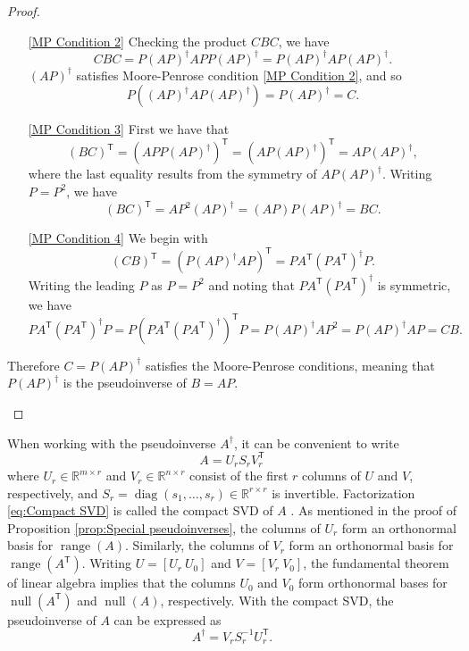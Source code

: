 \documentclass[12pt]{article}
\newcommand{\trans}[1]{{#1}^\mathsf{T}}	%
\newcommand{\inv}[1]{{#1}^{-1}}	%
\newcommand{\pinv}[1]{{#1}^\dagger}	%
\DeclareMathOperator{\diag}{diag}	%
\DeclareMathOperator{\range}{range}	%
\DeclareMathOperator{\nullspace}{null}	%
\newcommand{\singular}{s}	%
\begin{document}
\begin{proof}
\begin{enumerate}
\begin{enumerate}
        \item[\ref{MP Condition 2}] Checking the product $CBC$, we have 
        \[CBC = P\pinv{\left(AP\right)}APP\pinv{\left(AP\right)} = P\pinv{\left(AP\right)}AP\pinv{\left(AP\right)}.\]
        $\pinv{\left(AP\right)}$ satisfies Moore-Penrose condition \ref{MP Condition 2}, and so
        \[P\left(\pinv{\left(AP\right)}AP\pinv{\left(AP\right)}\right) = P\pinv{\left(AP\right)} = C.\]
        \item[\ref{MP Condition 3}] First we have that \[\trans{\left(BC\right)} = \trans{\left(APP\pinv{\left(AP\right)}\right)} = \trans{\left(AP\pinv{\left(AP\right)}\right)} = AP\pinv{\left(AP\right)},\]
        where the last equality results from the symmetry of $AP\pinv{\left(AP\right)}$. Writing $P = P^2$, we have
        \[\trans{\left(BC\right)} = AP^2\pinv{\left(AP\right)} = \left(AP\right)P\pinv{\left(AP\right)} = BC.\]
        \item[\ref{MP Condition 4}] We begin with
        \[\trans{\left(CB\right)} = \trans{\left(P\pinv{\left(AP\right)}AP\right)} = P\trans{A}\pinv{\left(P\trans{A}\right)}P.\]
        Writing the leading $P$ as $P = P^2$ and noting that $P\trans{A}\pinv{\left(P\trans{A}\right)}$ is symmetric, we have
        \[P\trans{A}\pinv{\left(P\trans{A}\right)}P = P\trans{\left(P\trans{A}\pinv{\left(P\trans{A}\right)}\right)}P = P\pinv{\left(AP\right)}AP^2 = P\pinv{\left(AP\right)}AP = CB.\]
    \end{enumerate}
    Therefore $C = P\pinv{\left(AP\right)}$ satisfies the Moore-Penrose conditions, meaning that $P\pinv{\left(AP\right)}$ is the pseudoinverse of $B = AP$.
\end{enumerate}
\end{proof}

When working with the pseudoinverse $\pinv{A}$, it can be convenient to write
\begin{equation}
\label{eq:Compact SVD}
A = U_rS_r\trans{V}_r
\end{equation}
where $U_r \in \mathbb{R}^{m \times r}$ and $V_r \in \mathbb{R}^{n \times r}$ consist of the first $r$ columns of $U$ and $V$, respectively, and $S_r = \diag(\singular_1,\ldots,\singular_{r}) \in \mathbb{R}^{r \times r}$ is invertible. Factorization \eqref{eq:Compact SVD} is called the compact SVD of $A$ \cite{ABT,Leon2010}. As mentioned in the proof of Proposition \ref{prop:Special pseudoinverses}, the columns of $U_r$ form an orthonormal basis for $\range(A)$. Similarly, the columns of $V_r$ form an orthonormal basis for $\range(\trans{A})$. Writing $U = [U_r ~ U_0]$ and $V = [V_r ~ V_0]$, the fundamental theorem of linear algebra \cite{Strang1993} implies that the columns $U_0$  and $V_0$ form orthonormal bases for $\nullspace(\trans{A})$ and $\nullspace(A)$, respectively. With the compact SVD, the pseudoinverse of $A$ can be expressed as 
\begin{equation}
\label{eq:Pseudoinverse}
    \pinv{A} = V_r\inv{S}_r\trans{U}_r.
\end{equation}
\end{document}
